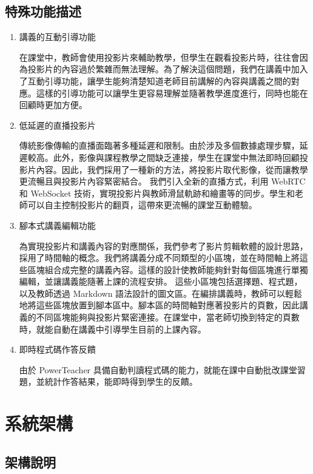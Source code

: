 \documentclass[12pt]{article}
\begin{document}
\subsection{特殊功能描述}
\begin{enumerate}[label=(\arabic*)]
  \setlength{\parindent}{2em}
  \item 講義的互動引導功能
  \par 在課堂中，教師會使用投影片來輔助教學，但學生在觀看投影片時，往往會因為投影片的內容過於繁雜而無法理解。為了解決這個問題，我們在講義中加入了互動引導功能，讓學生能夠清楚知道老師目前講解的內容與講義之間的對應。這樣的引導功能可以讓學生更容易理解並隨著教學進度進行，同時也能在回顧時更加方便。
  \item 低延遲的直播投影片
  \par 傳統影像傳輸的直播面臨著多種延遲和限制。由於涉及多個數據處理步驟，延遲較高。此外，影像與課程教學之間缺乏連接，學生在課堂中無法即時回顧投影片內容。因此，我們採用了一種新的方法，將投影片取代影像，從而讓教學更流暢且與投影片內容緊密結合。
  我們引入全新的直播方式，利用 WebRTC 和 WebSocket 技術，實現投影片與教師滑鼠軌跡和繪畫等的同步。學生和老師可以自主控制投影片的翻頁，這帶來更流暢的課堂互動體驗。
  \item 腳本式講義編輯功能
  \par 為實現投影片和講義內容的對應關係，我們參考了影片剪輯軟體的設計思路，採用了時間軸的概念。我們將講義分成不同類型的小區塊，並在時間軸上將這些區塊組合成完整的講義內容。這樣的設計使教師能夠針對每個區塊進行單獨編輯，並讓講義能隨著上課的流程安排。
  這些小區塊包括選擇題、程式題，以及教師透過 Markdown 語法設計的圖文區。在編排講義時，教師可以輕鬆地將這些區塊放置到腳本區中。腳本區的時間軸對應著投影片的頁數，因此講義的不同區塊能夠與投影片緊密連接。在課堂中，當老師切換到特定的頁數時，就能自動在講義中引導學生目前的上課內容。
  \item 即時程式碼作答反饋
  \par 由於 PowerTeacher 具備自動判讀程式碼的能力，就能在課中自動批改課堂習題，並統計作答結果，能即時得到學生的反饋。
\end{enumerate}

\section{系統架構}

\subsection{架構說明}
\end{document}
